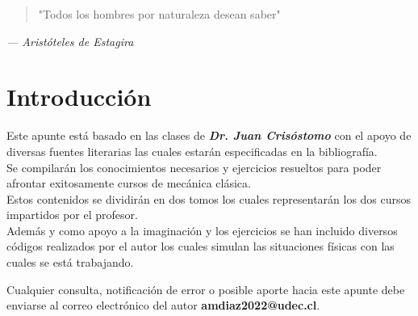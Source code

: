 \documentclass[../main.tex]{subfiles}
\begin{document}
\thispagestyle{empty}

\vspace*{\fill}  %
\begin{center}
    \begin{quote}
        "Todos los hombres por naturaleza desean saber"
    \end{quote}
    \vspace{1cm}  %
    \textit{— Aristóteles de Estagira}  %
\end{center}

\vspace*{\fill}  %
\newpage

\chapter*{Introducción}

Este apunte está basado en las clases de \textbf{\emph{Dr. Juan Crisóstomo}} con el apoyo de diversas fuentes literarias las cuales estarán especificadas en la bibliografía. \\
Se compilarán los conocimientos necesarios y ejercicios resueltos para poder afrontar exitosamente cursos de mecánica clásica.  \\
Estos contenidos se dividirán en dos tomos los cuales representarán los dos cursos impartidos por el profesor. \\
Además y como apoyo a la imaginación y los ejercicios se han incluido diversos códigos realizados por el autor los cuales simulan las situaciones físicas con las cuales se está trabajando.

\medskip

Cualquier consulta, notificación de error o posible aporte hacia este apunte debe enviarse al correo electrónico del autor \textbf{amdiaz2022@udec.cl}.
\end{document}
